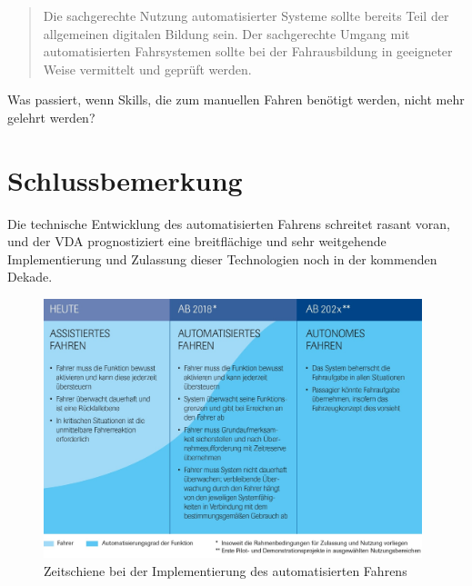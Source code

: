 \documentclass[twoside,a4paper,12pt]{article}
\begin{document}
\begin{quote}
\glqq
Die sachgerechte Nutzung automatisierter Systeme sollte bereits Teil der allgemeinen digitalen Bildung sein. Der sachgerechte 
Umgang mit automatisierten Fahrsystemen sollte
bei der Fahrausbildung in geeigneter Weise vermittelt und geprüft werden.\grqq\mbox{~\cite[S. 13]{ek}}
\end{quote}

Was passiert, wenn Skills, die zum manuellen Fahren benötigt werden, nicht mehr gelehrt werden?

\newpage

\cleardoublepage
\section{Schlussbemerkung}

Die technische Entwicklung des automatisierten Fahrens schreitet rasant voran, und der VDA prognostiziert eine breitflächige und sehr weitgehende Implementierung
und Zulassung dieser Technologien noch in der kommenden Dekade.\\

\begin{figure}[H]
\centering
\includegraphics[width=11cm]{resources/zeitschiene-automatisierungsgrade.jpg}
\caption[Zeitschiene bei der Implementierung des automatisierten Fahrens]{Zeitschiene bei der Implementierung des automatisierten Fahrens~\cite{vda}}
\label{figure:ZeitschieneAutomatisierungsgrade}
\end{figure}


\newpage
\end{document}
